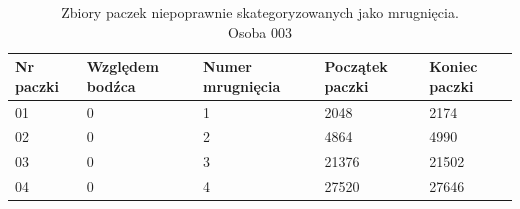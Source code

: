 \documentclass{article}
\begin{document}
            \begin{table}[H]
                \captionsetup{justification=centering}
                \caption {Zbiory paczek niepoprawnie skategoryzowanych jako mrugnięcia. \\Osoba 003}
                \begin{center}
                    \begin{tabular}{| p{1cm} | p{1.75cm} | p{1.75cm} | p{1.75cm} | p{1.75cm} |}
                        \hline
                        Nr paczki & Względem bodźca & Numer mrugnięcia & Początek paczki & Koniec paczki \\
                        \hline
                        \hline
                        01 & 0 & 1 & 2048 & 2174 \\
                        \hline
                        02 & 0 & 2 & 4864 & 4990 \\
                        \hline
                        03 & 0 & 3 & 21376 & 21502 \\
                        \hline
                        04 & 0 & 4 & 27520 & 27646 \\
                        \hline
                    \end{tabular}
                \end{center}
            \end{table}
\end{document}
